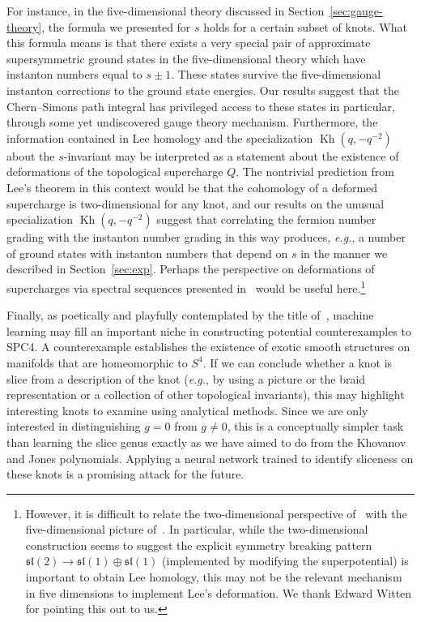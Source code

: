 \documentclass[11pt]{article}
\DeclareMathOperator{\Kh}{Kh}
\numberwithin{equation}{section}
\begin{document}
For instance, in the five-dimensional theory discussed in Section~\ref{sec:gauge-theory}, the formula we presented for $s$ holds for a certain subset of knots.
What this formula means is that there exists a very special pair of approximate supersymmetric ground states in the five-dimensional theory which have instanton numbers equal to $s \pm 1$.
These states survive the five-dimensional instanton corrections to the ground state energies.
Our results suggest that the Chern--Simons path integral has privileged access to these states in particular, through some yet undiscovered gauge theory mechanism.
Furthermore, the information contained in Lee homology and the specialization $\Kh(q,-q^{-2})$ about the $s$-invariant may be interpreted as a statement about the existence of deformations of the topological supercharge $Q$.
The nontrivial prediction from Lee's theorem in this context would be that the cohomology of a deformed supercharge is two-dimensional for any knot, and our results on the unusual specialization $\Kh(q,-q^{-2})$ suggest that correlating the fermion number grading with the instanton number grading in this way produces, \textit{e.g.}, a number of ground states with instanton numbers that depend on $s$ in the manner we described in Section~\ref{sec:exp}.
Perhaps the perspective on deformations of supercharges via spectral sequences presented in~\cite{Gukov:2015gmm} would be useful here.\footnote{However, it is difficult to relate the two-dimensional perspective of~\cite{Gukov:2015gmm} with the five-dimensional picture of~\cite{Witten:2011zz}.  In particular, while the two-dimensional construction seems to suggest the explicit symmetry breaking pattern $\mathfrak{sl}(2) \to \mathfrak{sl}(1) \oplus \mathfrak{sl}(1)$ (implemented by modifying the superpotential) is important to obtain Lee homology, this may not be the relevant mechanism in five dimensions to implement Lee's deformation.  We thank Edward Witten for pointing this out to us.}

Finally, as poetically and playfully contemplated by the title of~\cite{freedman2010man}, machine learning may fill an important niche in constructing potential counterexamples to SPC4.
A counterexample establishes the existence of exotic smooth structures on manifolds that are homeomorphic to $S^4$.
If we can conclude whether a knot is slice from a description of the knot (\textit{e.g.}, by using a picture or the braid representation or a collection of other topological invariants), this may highlight interesting knots to examine using analytical methods.
Since we are only interested in distinguishing $g=0$ from $g\ne 0$, this is a conceptually simpler task than learning the slice genus exactly as we have aimed to do from the Khovanov and Jones polynomials.
Applying a neural network trained to identify sliceness on these knots is a promising attack for the future.
\end{document}
